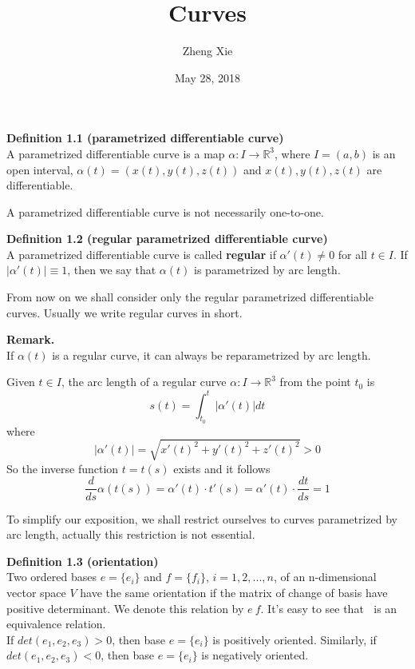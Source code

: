 \documentclass{article}
\author{Zheng Xie}
\title{Curves}
\date{May 28, 2018}
\begin{document}
\maketitle

\setlength\parindent{0em}   %
\setlength\parskip{1.0\baselineskip} %

\par
\textbf{Definition 1.1 (parametrized differentiable curve)}\\
A parametrized differentiable curve is a map $\alpha :I \to \mathbb R^3$, 
where $I = (a,b)$ is an open interval, $\alpha(t) = (x(t),y(t),z(t))$ and $x(t),y(t),z(t)$ are differentiable.

\par
A parametrized differentiable curve is not necessarily one-to-one.

\par
\textbf{Definition 1.2 (regular parametrized differentiable curve)}\\
A parametrized differentiable curve is called \textbf{regular} if $\alpha'(t) \neq 0$ for all $t \in I$.
If $|\alpha'(t)| \equiv 1$, then we say that $\alpha(t)$ is parametrized by arc length.

\par
From now on we shall consider only the regular parametrized differentiable curves.
Usually we write regular curves in short.

\par
\textbf{Remark.}\\
If $\alpha(t)$ is a regular curve, it can always be reparametrized by arc length.
\par
Given $t \in I$, the arc length of a regular curve $\alpha:I \to \mathbb R^3$ from the point $t_0$ is
$$
    s(t) = \int_{t_0}^t |{\alpha'(t)}|dt
$$
where
$$
    |{\alpha'(t)}| = \sqrt{x'(t)^2+y'(t)^2+z'(t)^2} > 0
$$
So the inverse function $t = t(s)$ exists and it follows
$$
    \frac{d}{ds}\alpha(t(s)) = \alpha'(t) \cdot t'(s) = \alpha'(t) \cdot \frac{dt}{ds} = 1
$$

\par
To simplify our exposition, we shall restrict ourselves to curves parametrized by arc length, 
actually this restriction is not essential.

\par
\textbf{Definition 1.3 (orientation)}\\
Two ordered bases $e = \{e_i\}$ and $f = \{f_i\}$, $i=1,2,...,n$, of an n-dimensional vector space $V$ have the
same orientation if the matrix of change of basis have positive determinant. We denote this relation by $e ~ f$.
It's easy to see that $~$ is an equivalence relation.\\
If $det(e_1, e_2, e_3) > 0$, then base $e = \{e_i\}$ is positively oriented. Similarly, if $det(e_1, e_2, e_3) < 0$,
then base $e = \{e_i\}$ is negatively oriented.
\end{document}
